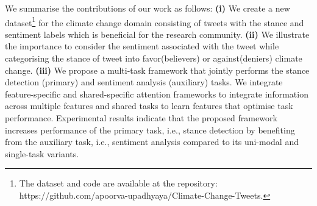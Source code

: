 \documentclass[letterpaper]{article}
\begin{document}
\par\noindent We summarise the contributions of our work as follows:
\textbf{(i)} We create a new dataset\footnote{The dataset and code are available at the repository:  https://github.com/apoorva-upadhyaya/Climate-Change-Tweets.} for the climate change domain consisting of tweets with the stance and sentiment labels which is beneficial for the research community. \textbf{(ii)} We illustrate the importance to consider the sentiment associated with the tweet while categorising the stance of tweet into favor(believers) or against(deniers) climate change. \textbf{(iii)} We propose a multi-task framework that jointly performs the stance detection (primary) and sentiment analysis (auxiliary) tasks. We integrate feature-specific and shared-specific attention frameworks to integrate information across multiple features and shared tasks to learn features that optimise task performance. Experimental results indicate that the proposed framework increases performance of the primary task, i.e., stance detection by benefiting from the auxiliary task, i.e., sentiment analysis compared to its uni-modal and single-task variants.
\end{document}
